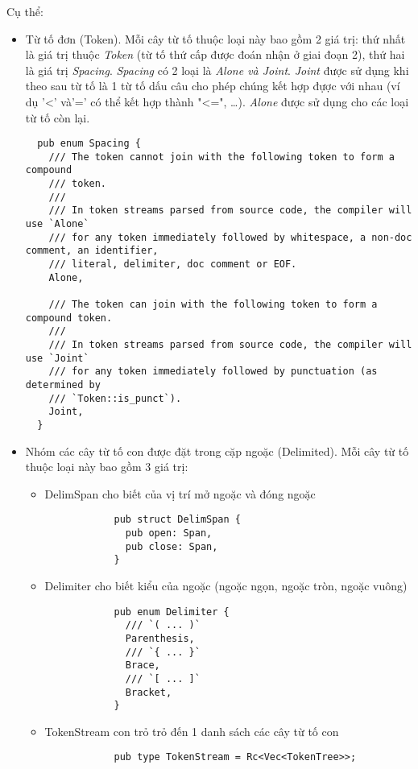 Cụ thể:
\begin{itemize}
  \item Từ tố đơn (Token). Mỗi cây từ tố thuộc loại này bao gồm 2 giá trị: thứ nhất là giá trị thuộc \textit{Token} (từ tố thứ cấp được đoán nhận ở giai đoạn 2), thứ hai là giá trị \textit{Spacing}. \textit{Spacing} có 2 loại là \textit{Alone \emph{và} Joint}. \textit{Joint} được sử dụng khi theo sau từ tố là 1 từ tố dấu câu cho phép chúng kết hợp đựợc với nhau (ví dụ '<' và'=' có thể kết hợp thành "<=", \dots). \textit{Alone} được sử dụng cho các loại từ tố còn lại. 
  \begin{lstlisting}
  pub enum Spacing {
    /// The token cannot join with the following token to form a compound
    /// token.
    ///
    /// In token streams parsed from source code, the compiler will use `Alone`
    /// for any token immediately followed by whitespace, a non-doc comment, an identifier,
    /// literal, delimiter, doc comment or EOF.
    Alone,

    /// The token can join with the following token to form a compound token.
    ///
    /// In token streams parsed from source code, the compiler will use `Joint`
    /// for any token immediately followed by punctuation (as determined by
    /// `Token::is_punct`).
    Joint,
  }
  \end{lstlisting}
  \item Nhóm các cây từ tố con được đặt trong cặp ngoặc (Delimited). Mỗi cây từ tố thuộc loại này bao gồm 3 giá trị:
  \begin{itemize}
    \item DelimSpan cho biết của vị trí mở ngoặc và đóng ngoặc
          \begin{lstlisting}
            pub struct DelimSpan {
              pub open: Span,
              pub close: Span,
            }
          \end{lstlisting}
    \item Delimiter cho biết kiểu của ngoặc (ngoặc ngọn, ngoặc tròn, ngoặc vuông)
          \begin{lstlisting}
            pub enum Delimiter {
              /// `( ... )`
              Parenthesis,
              /// `{ ... }`
              Brace,
              /// `[ ... ]`
              Bracket,
            }
          \end{lstlisting}
    \item TokenStream con trỏ trỏ đến 1 danh sách các cây từ tố con %
          \begin{lstlisting}
            pub type TokenStream = Rc<Vec<TokenTree>>;
          \end{lstlisting}
  \end{itemize}
\end{itemize}

